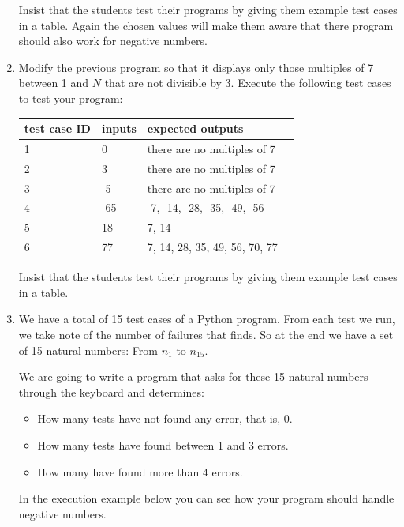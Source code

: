 \documentclass[
  fontsize=10pt,
  a4paper,
]{scrartcl}
\newenvironment{howTILEd}%
  {\begin{mdframed}[skipabove=10pt,skipbelow=10pt,backgroundcolor=pink!40]}%
  {\end{mdframed}}
\begin{document}
\begin{enumerate}
\begin{howTILEd}
Insist that the students test their programs by giving them example test cases in a table. Again the chosen values will make them aware that there program should also work for negative numbers.
\end{howTILEd}


\item Modify the previous program so that it displays only those multiples of 7 between 1 and $N$ that are not divisible by 3. Execute the following test cases to test your program:

\begin{tabular}{|l|l|l|l|}
\hline
test case ID  & inputs & expected outputs  \\ 
\hline\hline
1 & 0 & there are no multiples of 7\\
2 & 3 & there are no multiples of 7\\
3 & -5 & there are no multiples of 7\\
4 & -65 & -7, -14, -28, -35, -49, -56\\
5 & 18 & 7, 14\\
6 & 77 & 7, 14, 28, 35, 49, 56, 70, 77\\
\hline
\end{tabular}


\begin{howTILEd}
Insist that the students test their programs by giving them example test cases in a table.
\end{howTILEd}




\item We have a total of 15 test cases of a Python program. From each test we run, we take note of the number of failures that finds. So at the end we have a set of 15 natural numbers: From $n_1$ to $n_{15}$.

We are going to write a program that asks for these 15 natural numbers through the keyboard and determines:

\begin{itemize}
\item How many tests have not found any error, that is, 0.
\item How many tests have found between 1 and 3 errors.
\item How many have found more than 4 errors.
\end{itemize}

In the execution example below you can see how your program should handle negative numbers.


\end{enumerate}
\end{document}
